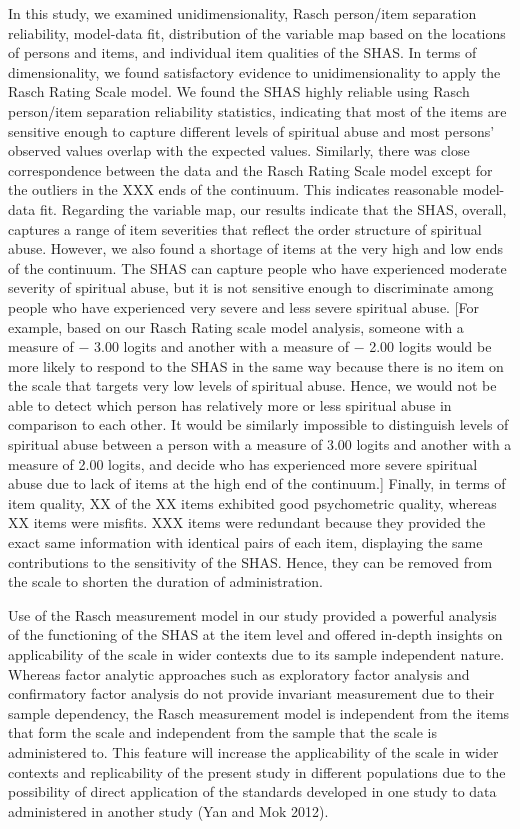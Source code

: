 \documentclass[
]{article}
\begin{document}
In this study, we examined unidimensionality, Rasch person/item separation reliability, model-data fit, distribution of the variable map based on the locations of persons and items, and individual item qualities of the SHAS. In terms of dimensionality, we found satisfactory evidence to unidimensionality to apply the Rasch Rating Scale model. We found the SHAS highly reliable using Rasch person/item separation reliability statistics, indicating that most of the items are sensitive enough to capture different levels of spiritual abuse and most persons' observed values overlap with the expected values. Similarly, there was close correspondence between the data and the Rasch Rating Scale model except for the outliers in the XXX ends of the continuum. This indicates reasonable model-data fit. Regarding the variable map, our results indicate that the SHAS, overall, captures a range of item severities that reflect the order structure of spiritual abuse. However, we also found a shortage of items at the very high and low ends of the continuum. The SHAS can capture people who have experienced moderate severity of spiritual abuse, but it is not sensitive enough to discriminate among people who have experienced very severe and less severe spiritual abuse. {[}For example, based on our Rasch Rating scale model analysis, someone with a measure of − 3.00 logits and another with a measure of − 2.00 logits would be more likely to respond to the SHAS in the same way because there is no item on the scale that targets very low levels of spiritual abuse. Hence, we would not be able to detect which person has relatively more or less spiritual abuse in comparison to each other. It would be similarly impossible to distinguish levels of spiritual abuse between a person with a measure of 3.00 logits and another with a measure of 2.00 logits, and decide who has experienced more severe spiritual abuse due to lack of items at the high end of the continuum.{]} Finally, in terms of item quality, XX of the XX items exhibited good psychometric quality, whereas XX items were misfits. XXX items were redundant because they provided the exact same information with identical pairs of each item, displaying the same contributions to the sensitivity of the SHAS. Hence, they can be removed from the scale to shorten the duration of administration.

Use of the Rasch measurement model in our study provided a powerful analysis of the functioning of the SHAS at the item level and offered in-depth insights on applicability of the scale in wider contexts due to its sample independent nature. Whereas factor analytic approaches such as exploratory factor analysis and confirmatory factor analysis do not provide invariant measurement due to their sample dependency, the Rasch measurement model is independent from the items that form the scale and independent from the sample that the scale is administered to. This feature will increase the applicability of the scale in wider contexts and replicability of the present study in different populations due to the possibility of direct application of the standards developed in one study to data administered in another study (Yan and Mok 2012).
\end{document}
